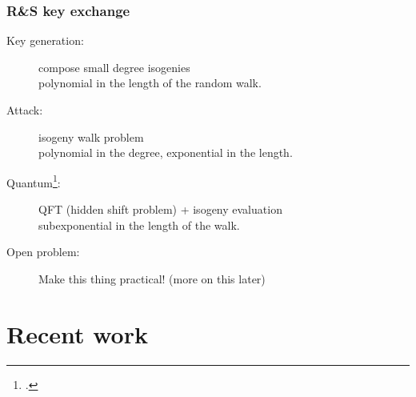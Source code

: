 \documentclass{beamer}
\begin{document}
\begin{frame}
  \frametitle{R\&S key exchange}

  \begin{center}
  \end{center}

  \begin{description}
  \item[Key generation:] compose small degree
    isogenies\\\alert{polynomial in the length of the random walk}.
  \item[Attack:] isogeny walk problem\\\alert{polynomial in the
      degree, exponential in the length}.
  \item[Quantum\footcite{childs+jao+soukharev10}:] QFT (hidden shift
    problem) + isogeny evaluation\\\alert{subexponential in the length
      of the walk}.
  \item[Open problem:] Make this thing practical! (more on this later)
  \end{description}
\end{frame}

\section{Recent work}
\end{document}
